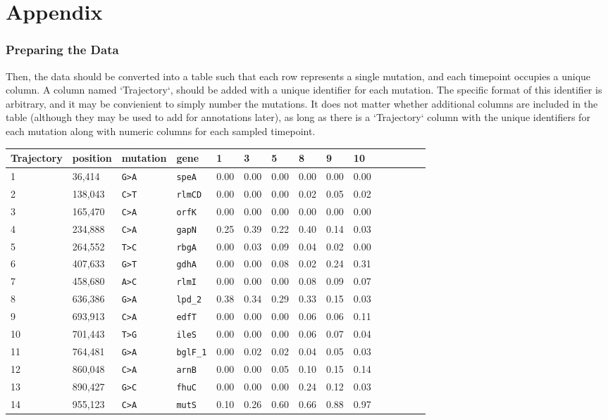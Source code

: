 \documentclass{report}
\begin{document}
\chapter{Appendix}

\subsection{Preparing the Data}


Then, the data should be converted into a table such that each row represents a single mutation, and each timepoint occupies a unique column. 
A column named `Trajectory`, should be added with a unique identifier for each mutation. 
The specific format of this identifier is arbitrary, and it may be convienient to simply number the mutations. 
It does not matter whether additional columns are included in the table (although they may be used to add for annotations later), 
as long as there is a `Trajectory` column with the unique identifiers for each mutation along with numeric columns for each sampled timepoint.
\begin{tabular}{lllll|llllllllll}
 Trajectory & position & mutation & gene            & 1    & 3    & 5    & 8    & 9    & 10   \\
\hline
 1          & 36,414   & \verb|G>A| & \verb|speA|   & 0.00 & 0.00 & 0.00 & 0.00 & 0.00 & 0.00 \\
 2          & 138,043  & \verb|C>T| & \verb|rlmCD|  & 0.00 & 0.00 & 0.00 & 0.02 & 0.05 & 0.02 \\
 3          & 165,470  & \verb|C>A| & \verb|orfK|   & 0.00 & 0.00 & 0.00 & 0.00 & 0.00 & 0.00 \\
 4          & 234,888  & \verb|C>A| & \verb|gapN|   & 0.25 & 0.39 & 0.22 & 0.40 & 0.14 & 0.03 \\
 5          & 264,552  & \verb|T>C| & \verb|rbgA|   & 0.00 & 0.03 & 0.09 & 0.04 & 0.02 & 0.00 \\
 6          & 407,633  & \verb|G>T| & \verb|gdhA|   & 0.00 & 0.00 & 0.08 & 0.02 & 0.24 & 0.31 \\
 7          & 458,680  & \verb|A>C| & \verb|rlmI|   & 0.00 & 0.00 & 0.00 & 0.08 & 0.09 & 0.07 \\
 8          & 636,386  & \verb|G>A| & \verb|lpd_2|  & 0.38 & 0.34 & 0.29 & 0.33 & 0.15 & 0.03 \\
 9          & 693,913  & \verb|C>A| & \verb|edfT|   & 0.00 & 0.00 & 0.00 & 0.06 & 0.06 & 0.11 \\
 10         & 701,443  & \verb|T>G| & \verb|ileS|   & 0.00 & 0.00 & 0.00 & 0.06 & 0.07 & 0.04 \\
 11         & 764,481  & \verb|G>A| & \verb|bglF_1| & 0.00 & 0.02 & 0.02 & 0.04 & 0.05 & 0.03 \\
 12         & 860,048  & \verb|C>A| & \verb|arnB|   & 0.00 & 0.00 & 0.05 & 0.10 & 0.15 & 0.14 \\
 13         & 890,427  & \verb|G>C| & \verb|fhuC|   & 0.00 & 0.00 & 0.00 & 0.24 & 0.12 & 0.03 \\
 14         & 955,123  & \verb|C>A| & \verb|mutS|   & 0.10 & 0.26 & 0.60 & 0.66 & 0.88 & 0.97 \\
\end{tabular}
\end{document}
